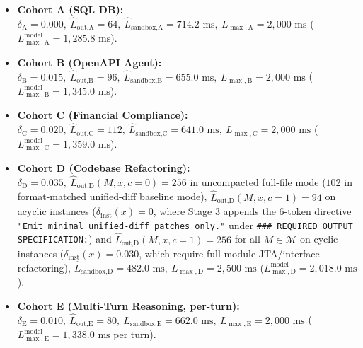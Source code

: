 \documentclass[conference,10pt]{IEEEtran}
\begin{document}
\begin{itemize}
    \item \textbf{Cohort A (SQL DB):} $\delta_{\text{A}}=0.000,\ \hat{L}_{\text{out,A}}=64,\ \hat{L}_{\text{sandbox,A}}=714.2\text{ ms},\ L_{\max,\text{A}}=2{,}000\text{ ms}$ ($L_{\max,\text{A}}^{\text{model}} = 1{,}285.8\text{ ms}$).
    \item \textbf{Cohort B (OpenAPI Agent):} $\delta_{\text{B}}=0.015,\ \hat{L}_{\text{out,B}}=96,\ \hat{L}_{\text{sandbox,B}}=655.0\text{ ms},\ L_{\max,\text{B}}=2{,}000\text{ ms}$ ($L_{\max,\text{B}}^{\text{model}} = 1{,}345.0\text{ ms}$).
    \item \textbf{Cohort C (Financial Compliance):} $\delta_{\text{C}}=0.020,\ \hat{L}_{\text{out,C}}=112,\ \hat{L}_{\text{sandbox,C}}=641.0\text{ ms},\ L_{\max,\text{C}}=2{,}000\text{ ms}$ ($L_{\max,\text{C}}^{\text{model}} = 1{,}359.0\text{ ms}$).
    \item \textbf{Cohort D (Codebase Refactoring):} $\delta_{\text{D}}=0.035,\ \hat{L}_{\text{out,D}}(M, x, c=0)=256$ in uncompacted full-file mode ($102$ in format-matched unified-diff baseline mode), $\hat{L}_{\text{out,D}}(M, x, c=1)=94$ on acyclic instances ($\delta_{\text{inst}}(x)=0$, where Stage 3 appends the 6-token directive \texttt{"Emit minimal unified-diff patches only."} under \texttt{\#\#\# REQUIRED OUTPUT SPECIFICATION:}) and $\hat{L}_{\text{out,D}}(M, x, c=1)=256$ for all $M \in \mathcal{M}$ on cyclic instances ($\delta_{\text{inst}}(x)=0.030$, which require full-module JTA/interface refactoring), $\hat{L}_{\text{sandbox,D}}=482.0\text{ ms},\ L_{\max,\text{D}}=2{,}500\text{ ms}$ ($L_{\max,\text{D}}^{\text{model}} = 2{,}018.0\text{ ms}$).
    \item \textbf{Cohort E (Multi-Turn Reasoning, per-turn):} $\delta_{\text{E}}=0.010,\ \hat{L}_{\text{out,E}}=80,\ \hat{L}_{\text{sandbox,E}}=662.0\text{ ms},\ L_{\max,\text{E}}=2{,}000\text{ ms}$ ($L_{\max,\text{E}}^{\text{model}} = 1{,}338.0\text{ ms}$ per turn).
\end{itemize}
\end{document}

